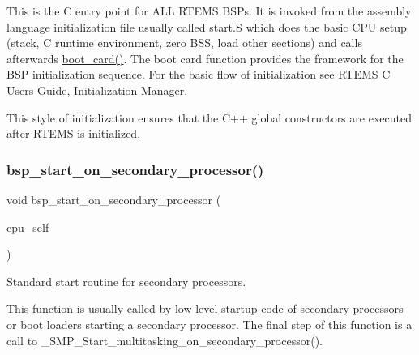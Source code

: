 This is the C entry point for A\+LL R\+T\+E\+MS B\+S\+Ps. It is invoked from the assembly language initialization file usually called {\ttfamily start.\+S} which does the basic C\+PU setup (stack, C runtime environment, zero B\+SS, load other sections) and calls afterwards \mbox{\hyperlink{group__RTEMSBSPsSharedStartup_gad8a18766fa4f3cf67d8f8ff8938008e0}{boot\+\_\+card()}}. The boot card function provides the framework for the B\+SP initialization sequence. For the basic flow of initialization see R\+T\+E\+MS C User\textquotesingle{}s Guide, Initialization Manager.

This style of initialization ensures that the C++ global constructors are executed after R\+T\+E\+MS is initialized. \mbox{\label{group__RTEMSBSPsSharedStartup_gae847768d4b83b8e3e4bc7313095ef7dd}} 
\subsubsection{\texorpdfstring{bsp\_start\_on\_secondary\_processor()}{bsp\_start\_on\_secondary\_processor()}}
{\footnotesize\ttfamily void bsp\+\_\+start\+\_\+on\+\_\+secondary\+\_\+processor (\begin{DoxyParamCaption}\item[{struct \mbox{\hyperlink{structPer__CPU__Control}{Per\+\_\+\+C\+P\+U\+\_\+\+Control}} $\ast$}]{cpu\+\_\+self }\end{DoxyParamCaption})}



Standard start routine for secondary processors. 

This function is usually called by low-\/level startup code of secondary processors or boot loaders starting a secondary processor. The final step of this function is a call to \+\_\+\+S\+M\+P\+\_\+\+Start\+\_\+multitasking\+\_\+on\+\_\+secondary\+\_\+processor(). 